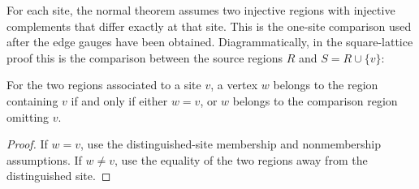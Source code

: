 \begin{definition}%
    \label{def:peps_normalOneSiteSeparationHypotheses}
    \leanok
    For each site, the normal theorem assumes two injective regions with
    injective complements that differ exactly at that site. This is the
    one-site comparison used after the edge gauges have been obtained.
    Diagrammatically, in the square-lattice proof this is the comparison
    between the source regions $R$ and $S=R\cup\{v\}$:
    \begin{center}
        \TNPEPSNormalOneSiteSeparation
    \end{center}
\end{definition}

\begin{theorem}%
    \label{thm:peps_normalOneSiteSeparation_mem_withSite_iff}
    \leanok
    For the two regions associated to a site $v$, a vertex $w$ belongs to
    the region containing $v$ if and only if either $w=v$, or $w$
    belongs to the comparison region omitting $v$.
\end{theorem}
\begin{proof}\leanok
    If $w=v$, use the distinguished-site membership and nonmembership
    assumptions. If $w\neq v$, use the equality of the two regions away
    from the distinguished site.
\end{proof}


